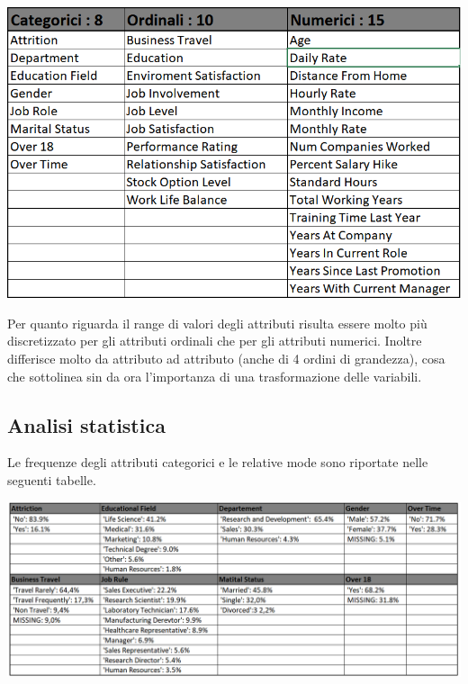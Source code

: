 \documentclass[a4paper,9pt]{article}
\begin{document}
\begin{center}
\includegraphics[scale=0.50]{semantics.png}
\end{center}
Per quanto riguarda il range di valori degli attributi risulta essere molto più discretizzato per gli attributi ordinali che per gli attributi numerici. Inoltre differisce molto da attributo ad attributo (anche di 4 ordini di grandezza), cosa che sottolinea sin da  ora l'importanza di una trasformazione delle variabili.

\subsection{Analisi statistica}
Le frequenze degli attributi categorici e le relative mode sono riportate nelle seguenti tabelle.

\begin{center}
\includegraphics[scale=1.28]{frequenza attributi nominali.png}
\end{center}
\end{document}
